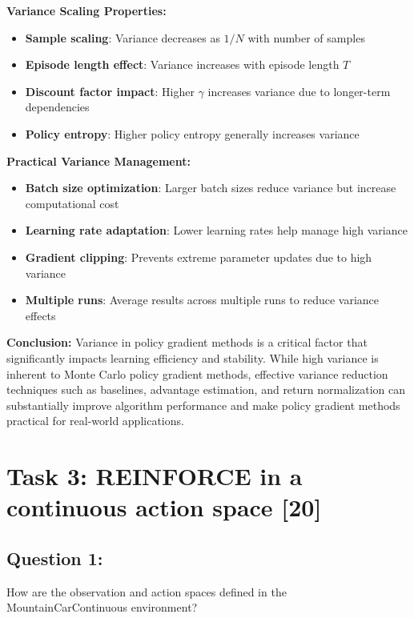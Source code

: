 \documentclass[12pt]{article}
\begin{document}
{{{\textbf{Variance Scaling Properties:}
\begin{itemize}
    \item \textbf{Sample scaling}: Variance decreases as $1/N$ with number of samples
    \item \textbf{Episode length effect}: Variance increases with episode length $T$
    \item \textbf{Discount factor impact}: Higher $\gamma$ increases variance due to longer-term dependencies
    \item \textbf{Policy entropy}: Higher policy entropy generally increases variance
\end{itemize}

\textbf{Practical Variance Management:}
\begin{itemize}
    \item \textbf{Batch size optimization}: Larger batch sizes reduce variance but increase computational cost
    \item \textbf{Learning rate adaptation}: Lower learning rates help manage high variance
    \item \textbf{Gradient clipping}: Prevents extreme parameter updates due to high variance
    \item \textbf{Multiple runs}: Average results across multiple runs to reduce variance effects
\end{itemize}

\textbf{Conclusion:}
Variance in policy gradient methods is a critical factor that significantly impacts learning efficiency and stability. While high variance is inherent to Monte Carlo policy gradient methods, effective variance reduction techniques such as baselines, advantage estimation, and return normalization can substantially improve algorithm performance and make policy gradient methods practical for real-world applications.

\newpage

\section{Task 3: REINFORCE in a continuous action space [20]}

\subsection{Question 1:}

How are the observation and action spaces defined in the MountainCarContinuous environment?
\vspace*{0.3cm}

}}}
\end{document}
